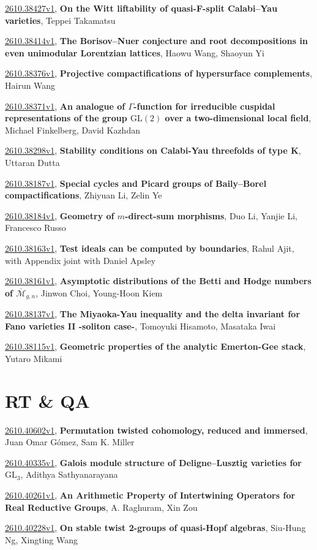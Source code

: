 \documentclass[9pt, a4paper]{article}
\theoremstyle{plain}
\theoremstyle{definition}
\theoremstyle{remark}
\newcommand{\arxiv}[3]{\href{https://arxiv.org/abs/#1}{#1}, \textbf{\textcolor{arxivblue}{#2}}, #3}
\begin{document}
\arxiv{2610.38427v1}{On the Witt liftability of quasi-F-split Calabi--Yau varieties}{Teppei Takamatsu}

\arxiv{2610.38414v1}{The Borisov--Nuer conjecture and root decompositions in even unimodular Lorentzian lattices}{Haowu Wang, Shaoyun Yi}

\arxiv{2610.38376v1}{Projective compactifications of hypersurface complements}{Hairun Wang}

\arxiv{2610.38371v1}{An analogue of $Γ$-function for irreducible cuspidal representations of the group $\mathrm{GL}(2)$ over a two-dimensional local field}{Michael Finkelberg, David Kazhdan}

\arxiv{2610.38298v1}{Stability conditions on Calabi-Yau threefolds of type K}{Uttaran Dutta}

\arxiv{2610.38187v1}{Special cycles and Picard groups of Baily--Borel compactifications}{Zhiyuan Li, Zelin Ye}

\arxiv{2610.38184v1}{Geometry of $m$-direct-sum morphisms}{Duo Li, Yanjie Li, Francesco Russo}

\arxiv{2610.38163v1}{Test ideals can be computed by boundaries}{Rahul Ajit, with Appendix joint with Daniel Apsley}

\arxiv{2610.38161v1}{Asymptotic distributions of the Betti and Hodge numbers of $\overline{\mathcal M}_{g,n}$}{Jinwon Choi, Young-Hoon Kiem}

\arxiv{2610.38137v1}{The Miyaoka-Yau inequality and the delta invariant for Fano varieties II -soliton case-}{Tomoyuki Hisamoto, Masataka Iwai}

\arxiv{2610.38115v1}{Geometric properties of the analytic Emerton-Gee stack}{Yutaro Mikami}


\section{RT \& QA}
\arxiv{2610.40602v1}{Permutation twisted cohomology, reduced and immersed}{Juan Omar Gómez, Sam K. Miller}

\arxiv{2610.40335v1}{Galois module structure of Deligne--Lusztig varieties for $\mathrm{GL}_3$}{Adithya Sathyanarayana}

\arxiv{2610.40261v1}{An Arithmetic Property of Intertwining Operators for Real Reductive Groups}{A. Raghuram, Xin Zou}

\arxiv{2610.40228v1}{On stable twist 2-groups of quasi-Hopf algebras}{Siu-Hung Ng, Xingting Wang}
\end{document}
